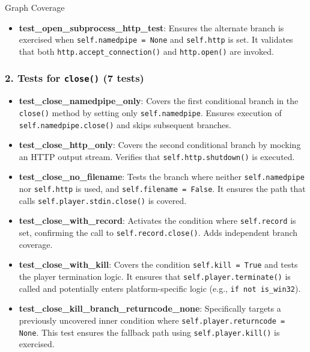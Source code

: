 \documentclass[a4paper]{scrreprt}
\newcounter{question}
\begin{document}
\begin{question}{Graph Coverage}
\begin{enumerate}[topsep=0pt, leftmargin=*]
\begin{answer}
\begin{itemize}
    \item \textbf{test\_open\_subprocess\_http\_test}: Ensures the alternate branch is exercised when \texttt{self.namedpipe = None} and \texttt{self.http} is set. It validates that both \texttt{http.accept\_connection()} and \texttt{http.open()} are invoked.
\end{itemize}

\subsubsection*{2. Tests for \texttt{close()} (7 tests)}

\begin{itemize}
    \item \textbf{test\_close\_namedpipe\_only}: Covers the first conditional branch in the \texttt{close()} method by setting only \texttt{self.namedpipe}. Ensures execution of \texttt{self.namedpipe.close()} and skips subsequent branches.

    \item \textbf{test\_close\_http\_only}: Covers the second conditional branch by mocking an HTTP output stream. Verifies that \texttt{self.http.shutdown()} is executed.

    \item \textbf{test\_close\_no\_filename}: Tests the branch where neither \texttt{self.namedpipe} nor \texttt{self.http} is used, and \texttt{self.filename = False}. It ensures the path that calls \texttt{self.player.stdin.close()} is covered.

    \item \textbf{test\_close\_with\_record}: Activates the condition where \texttt{self.record} is set, confirming the call to \texttt{self.record.close()}. Adds independent branch coverage.

    \item \textbf{test\_close\_with\_kill}: Covers the condition \texttt{self.kill = True} and tests the player termination logic. It ensures that \texttt{self.player.terminate()} is called and potentially enters platform-specific logic (e.g., \texttt{if not is\_win32}).

    \item \textbf{test\_close\_kill\_branch\_returncode\_none}: Specifically targets a previously uncovered inner condition where \texttt{self.player.returncode = None}. This test ensures the fallback path using \texttt{self.player.kill()} is exercised.
\end{itemize}


\end{answer}
\end{enumerate}
\end{question}
\end{document}
